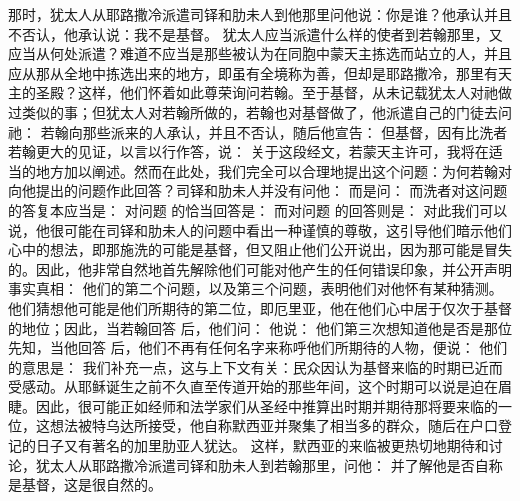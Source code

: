 那时，犹太人从耶路撒冷派遣司铎和肋未人到他那里问他说：你是谁？他承认并且不否认，他承认说：我不是基督。 犹太人应当派遣什么样的使者到若翰那里，又应当从何处派遣？难道不应当是那些被认为在同胞中蒙天主拣选而站立的人，并且应从那从全地中拣选出来的地方，即虽有全境称为善，但却是耶路撒冷，那里有天主的圣殿？这样，他们怀着如此尊荣询问若翰。至于基督，从未记载犹太人对祂做过类似的事；但犹太人对若翰所做的，若翰也对基督做了，他派遣自己的门徒去问祂： 若翰向那些派来的人承认，并且不否认，随后他宣告： 但基督，因有比洗者若翰更大的见证，以言以行作答，说： 关于这段经文，若蒙天主许可，我将在适当的地方加以阐述。然而在此处，我们完全可以合理地提出这个问题：为何若翰对向他提出的问题作此回答？司铎和肋未人并没有问他： 而是问： 而洗者对这问题的答复本应当是： 对问题 的恰当回答是： 而对问题 的回答则是： 对此我们可以说，他很可能在司铎和肋未人的问题中看出一种谨慎的尊敬，这引导他们暗示他们心中的想法，即那施洗的可能是基督，但又阻止他们公开说出，因为那可能是冒失的。因此，他非常自然地首先解除他们可能对他产生的任何错误印象，并公开声明事实真相： 他们的第二个问题，以及第三个问题，表明他们对他怀有某种猜测。他们猜想他可能是他们所期待的第二位，即厄里亚，他在他们心中居于仅次于基督的地位；因此，当若翰回答 后，他们问： 他说： 他们第三次想知道他是否是那位先知，当他回答 后，他们不再有任何名字来称呼他们所期待的人物，便说： 他们的意思是： 我们补充一点，这与上下文有关：民众因认为基督来临的时期已近而受感动。从耶稣诞生之前不久直至传道开始的那些年间，这个时期可以说是迫在眉睫。因此，很可能正如经师和法学家们从圣经中推算出时期并期待那将要来临的一位，这想法被特乌达所接受，他自称默西亚并聚集了相当多的群众，随后在户口登记的日子又有著名的加里肋亚人犹达。 这样，默西亚的来临被更热切地期待和讨论，犹太人从耶路撒冷派遣司铎和肋未人到若翰那里，问他： 并了解他是否自称是基督，这是很自然的。\par


